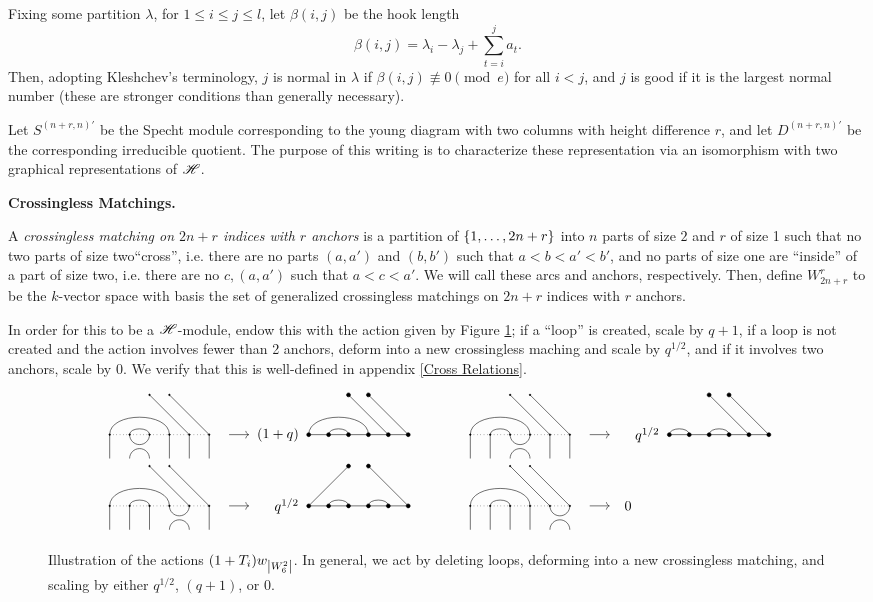 \documentclass{amsart}
\newcommand{\fakesubsection}[1]{
  \vspace{7pt}
  \noindent \textbf{#1.}
}
\begin{document}
Fixing some partition $\lambda$, for $1 \leq i \leq j \leq l$, let $\beta(i,j)$ be the hook length
\[
  \beta(i,j) = \lambda_i - \lambda_j + \sum_{t = i}^j a_t.
\]
Then, adopting Kleshchev's terminology, $j$ is normal in $\lambda$ if $\beta(i,j) \not\equiv 0 \pmod e$ for all $i < j$, and $j$ is good if it is the largest normal number (these are stronger conditions than generally necessary). 

Let $S^{(n+r,n)'}$ be the Specht module corresponding to the young diagram with two columns with height difference $r$, and let $D^{(n+r,n)'}$ be the corresponding irreducible quotient.
The purpose of this writing is to characterize these representation via an isomorphism with two graphical representations of $\mathscr{H}$.

\fakesubsection{Crossingless Matchings}

\begin{definition}
  A \emph{crossingless matching on $2n+r$ indices with $r$ anchors} is a partition of $\left\{ 1,\dots,2n+r \right\}$ into $n$ parts of size $2$ and $r$ of size 1 such that no two parts of size two``cross'', i.e. there are no parts $(a,a')$ and $(b,b')$ such that $a < b < a' < b'$, and no parts of size one are ``inside'' of a part of size two, i.e. there are no $c, (a,a')$ such that $a < c < a'$.
  We will call these arcs and anchors, respectively.
  Then, define $W^r_{2n+r}$ to be the $k$-vector space with basis the set of generalized crossingless matchings on $2n+r$ indices with $r$ anchors.

  In order for this to be a $\mathscr{H}$-module, endow this with the action given by Figure \ref{Action}; 
  if a ``loop'' is created, scale by $q+1$, if a loop is not created and the action involves fewer than 2 anchors, deform into a new crossingless maching and scale by $q^{1/2}$, and if it involves two anchors, scale by 0.
  We verify that this is well-defined in appendix \ref{Cross Relations}.
\end{definition}

\begin{figure}[b]
  \[
    \begin{tabular}{l l}
      \GeneralizedAction{6}{1/4,2/3}{2}{5/1,6/2}{1}{2}{1/4, 2/3}{5/1,6/2}{(1+q)}
      \hspace{20pt}
      &
      \GeneralizedAction{6}{1/4,2/3}{2}{5/1,6/2}{1}{3}{1/2, 3/4}{5/1,6/2}{q^{1/2}}\\
      \GeneralizedAction{6}{1/4,2/3}{2}{5/1,6/2}{1}{4}{2/3, 4/5}{1/1,6/2}{q^{1/2}}
      &
      \GeneralizedZeroAction{6}{1/4,2/3}{2}{5/1,6/2}{1}{5}
    \end{tabular}
  \]
    
  \caption{Illustration of the actions $(1 + T_i)w_{\left| W^2_6 \right|}$.
    In general, we act by deleting loops, deforming into a new crossingless matching, and scaling by either $q^{1/2}$, $(q + 1)$, or 0.
  }
  \label{Action}
\end{figure}
\end{document}
